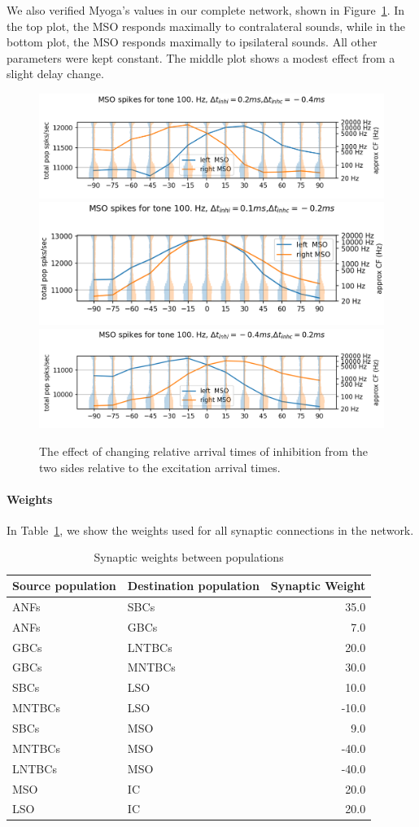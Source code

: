 \documentclass[11pt,a4paper]{article}
\begin{document}
We also verified Myoga's values in our complete network, shown in Figure~\ref{fig:myoga-on-big-net}. In the top plot, the MSO responds maximally to contralateral sounds, while in the bottom plot, the MSO responds maximally to ipsilateral sounds. All other parameters were kept constant. The middle plot shows a modest effect from a slight delay change.

\begin{figure}[H]
    \centering
    \includegraphics[width=0.5\linewidth]{Images/msonormal.png}
    \includegraphics[width=0.5\linewidth]{Images/msocenter.png}
    \includegraphics[width=0.5\linewidth]{Images/msoabnormal.png}
    \caption{The effect of changing relative arrival times of inhibition from the two sides relative to the excitation arrival times.}
    \label{fig:myoga-on-big-net}
\end{figure}

\paragraph{Weights}

In Table~\ref{tab:connections-weights}, we show the weights used for all synaptic connections in the network.
\begin{table}[h]
\centering
\begin{tabular}{|l|l|r|}
\hline
\rowcolor{bluePoli!40}
Source population & Destination population & Synaptic Weight \\
\hline
ANFs & SBCs & 35.0 \\
ANFs & GBCs & 7.0 \\
\hline
GBCs & LNTBCs & 20.0 \\
GBCs & MNTBCs & 30.0 \\
SBCs & LSO & 10.0 \\
MNTBCs & LSO & -10.0 \\
SBCs & MSO & 9.0 \\
MNTBCs & MSO & -40.0 \\
LNTBCs & MSO & -40.0 \\
\hline
MSO & IC & 20.0 \\
LSO & IC & 20.0 \\
\hline
\end{tabular}
\caption{Synaptic weights between populations}
\label{tab:connections-weights}
\end{table}
\end{document}
